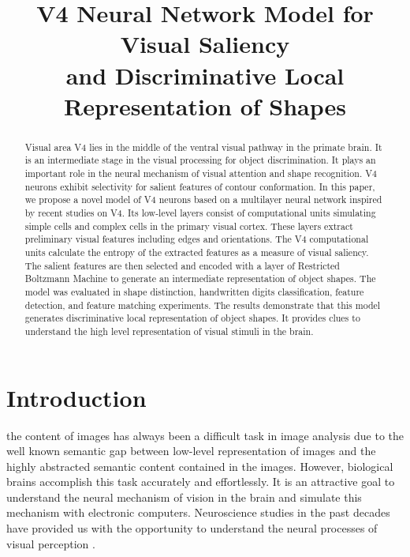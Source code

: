 \documentclass[conference]{IEEEtran}
\begin{document}
\title{V4 Neural Network Model for Visual Saliency \\
and Discriminative Local Representation of Shapes}

\author{%
{}
}

\maketitle

\begin{abstract}
Visual area V4 lies in the middle of the ventral visual pathway in the primate brain. 
It is an intermediate stage in the visual processing for object discrimination. 
It plays an important role in the neural mechanism of visual attention and shape recognition.
V4 neurons exhibit selectivity for salient features of contour conformation.
In this paper, we propose a novel model of V4 neurons based on a multilayer neural network
inspired by recent studies on V4.
Its low-level layers consist of computational units simulating simple cells and complex cells
in the primary visual cortex.
These layers extract preliminary visual features including edges and orientations.
The V4 computational units calculate the entropy of the extracted features 
as a measure of visual saliency.
The salient features are then selected and encoded with a layer of 
Restricted Boltzmann Machine to generate an intermediate representation of object shapes.
The model was evaluated in shape distinction, handwritten digits classification, feature detection, 
and feature matching experiments.
The results demonstrate that this model generates discriminative local representation
of object shapes.
It provides clues to understand the high level representation of visual stimuli in the brain.
\end{abstract}

\section{Introduction}

 the content of images has always been a difficult task 
in image analysis due to the well known semantic gap \cite{smeulders2000}
between low-level representation of images and the highly abstracted semantic 
content contained in the images.
However, biological brains accomplish this task accurately and effortlessly.
It is an attractive goal to understand the neural mechanism of vision in the brain
and simulate this mechanism with electronic computers.
Neuroscience studies in the past decades have provided us with the opportunity
to understand the neural processes of visual perception \cite{ungerleider2011}.
\end{document}
